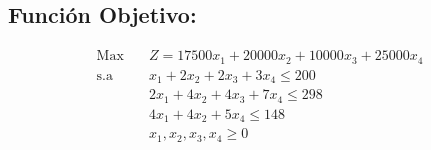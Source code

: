 \documentclass{templateNote}
\begin{document}
\subsection*{Función Objetivo:}
\begin{equation*}
    \begin{aligned}
        \text{Max} \quad & Z = 17500x_1 + 20000x_2 + 10000x_3 + 25000x_4 \\
        \text{s.a} \quad & x_1 + 2x_2 + 2x_3 + 3x_4 \leq 200 \\
        & 2x_1 + 4x_2 + 4x_3 + 7x_4 \leq 298 \\
        & 4x_1 + 4x_2 + 5x_4 \leq 148 \\
        & x_1, x_2, x_3, x_4 \geq 0
    \end{aligned}
\end{equation*}
\end{document}
